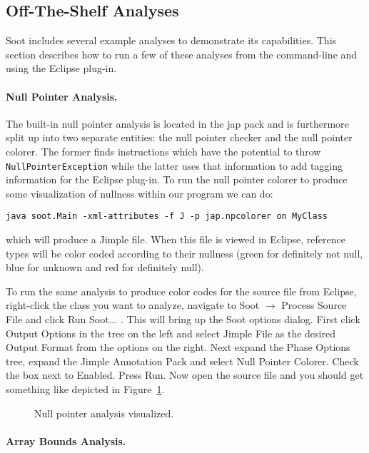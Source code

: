 \documentclass{article}
\newcommand{\code}[1]{\texttt{\small #1}}
\begin{document}
\subsection{Off-The-Shelf Analyses}

Soot includes several example analyses to demonstrate its
capabilities. This section describes how to run a few of these analyses
from the command-line and using the Eclipse plug-in.

\paragraph{Null Pointer Analysis.}

The built-in null pointer analysis is located in the jap pack and is
furthermore split up into two separate entities: the null pointer
checker and the null pointer colorer. The former finds instructions
which have the potential to throw \code{NullPointerException} while
the latter uses that information to add tagging information for the
Eclipse plug-in. To run the null pointer colorer to produce some
visualization of nullness within our program we can do:
\begin{center}
  \code{java soot.Main -xml-attributes -f J -p jap.npcolorer on MyClass}
\end{center}
which will produce a Jimple file. When this file is viewed in Eclipse,
reference types will be color coded according to their nullness (green
for definitely not null, blue for unknown and red for definitely null).

To run the same analysis to produce color codes for the source file
from Eclipse, right-click the class you want to analyze, navigate to
Soot $\rightarrow$ Process Source File and click Run Soot... . This
will bring up the Soot options dialog. First click Output Options in
the tree on the left and select Jimple File as the desired Output
Format from the options on the right. Next expand the Phase Options
tree, expand the Jimple Annotation Pack and select Null Pointer
Colorer. Check the box next to Enabled. Press Run. Now open the source
file and you should get something like depicted in
Figure~\ref{fig:npcolorer}.

\begin{figure}[!htb]
  \centering
  \caption{Null pointer analysis visualized.}
  \label{fig:npcolorer}
\end{figure}

\paragraph{Array Bounds Analysis.}
\end{document}
